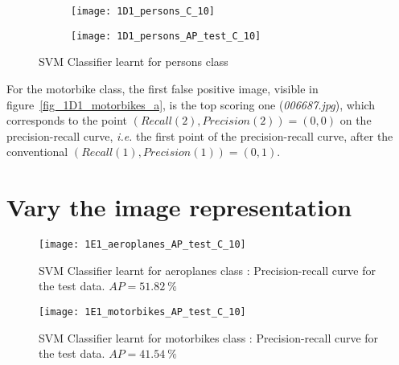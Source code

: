 \documentclass{article}
\begin{document}
\begin{figure}[ht!]
	\centering
	\begin{subfigure}[b]{\textwidth}
		\centering
		\texttt{[image: 1D1\_persons\_C\_10]}
		\label{fig_1D1_persons_a}
	\end{subfigure}
	\begin{subfigure}[b]{0.8\textwidth}
		\centering
		\texttt{[image: 1D1\_persons\_AP\_test\_C\_10]}
		\label{fig_1D1_persons_b}
	\end{subfigure}
	\caption{SVM Classifier learnt for persons class}
	\label{fig_1D1_persons}
\end{figure}

\clearpage
{}

For the motorbike class, the first false positive image, visible in figure~\ref{fig_1D1_motorbikes_a}, is the top scoring one (\textit{006687.jpg}), which corresponds to the point \( (Recall(2), Precision(2)) = (0,0)\) on the precision-recall curve, \textit{i.e.} the first point of the precision-recall curve, after the conventional  \( (Recall(1), Precision(1)) = (0,1)\).

\section{Vary the image representation}


\begin{figure}[ht!]
	\centering
	\texttt{[image: 1E1\_aeroplanes\_AP\_test\_C\_10]}
	\caption{SVM Classifier learnt for aeroplanes class : Precision-recall curve for the test data. \(AP = 51.82~\%\)}
	\label{fig_1E1_aeroplanes}
\end{figure}

\begin{figure}[ht!]
	\centering
	\texttt{[image: 1E1\_motorbikes\_AP\_test\_C\_10]}
	\caption{SVM Classifier learnt for motorbikes class : Precision-recall curve for the test data. \(AP = 41.54~\%\)}
	\label{fig_1E1_motorbikes}
\end{figure}
\end{document}
